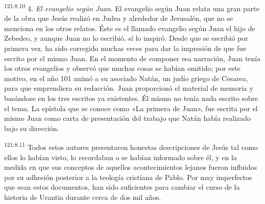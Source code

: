 \par
\textsuperscript{121:8.10} 4. \textit{El evangelio según Juan}. El evangelio según Juan relata una gran parte de la obra que Jesús realizó en Judea y alrededor de Jerusalén, que no se menciona en los otros relatos. Éste es el llamado evangelio según Juan el hijo de Zebedeo, y aunque Juan no lo escribió, sí lo inspiró. Desde que se escribió por primera vez, ha sido corregido muchas veces para dar la impresión de que fue escrito por el mismo Juan. En el momento de componer esa narración, Juan tenía los otros evangelios y observó que muchas cosas se habían omitido; por este motivo, en el año 101 animó a su asociado Natán, un judío griego de Cesarea, para que emprendiera su redacción. Juan proporcionó el material de memoria y basándose en los tres escritos ya existentes. Él mismo no tenía nada escrito sobre el tema. La epístola que se conoce como «La primera de Juan», fue escrita por el mismo Juan como carta de presentación del trabajo que Natán había realizado bajo su dirección.

\par
\textsuperscript{121:8.11} Todos estos autores presentaron honestas descripciones de Jesús tal como ellos lo habían visto, lo recordaban o se habían informado sobre él, y en la medida en que sus conceptos de aquellos acontecimientos lejanos fueron influidos por su adhesión posterior a la teología cristiana de Pablo. Por muy imperfectos que sean estos documentos, han sido suficientes para cambiar el curso de la historia de Urantia durante cerca de dos mil años.

